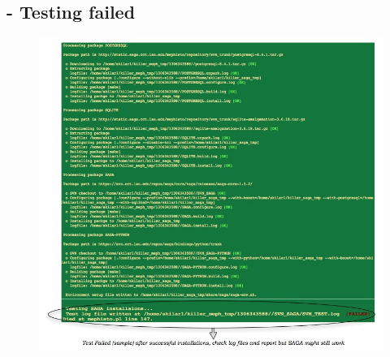 \documentclass[a4paper,10pt]{article}
\begin{document}
\subsection*{- Testing failed}
\begin{figure}[H]
\begin{center}
\includegraphics[scale=0.60]{test_fail.jpg}
\end{center}
\end{figure}
\end{document}
